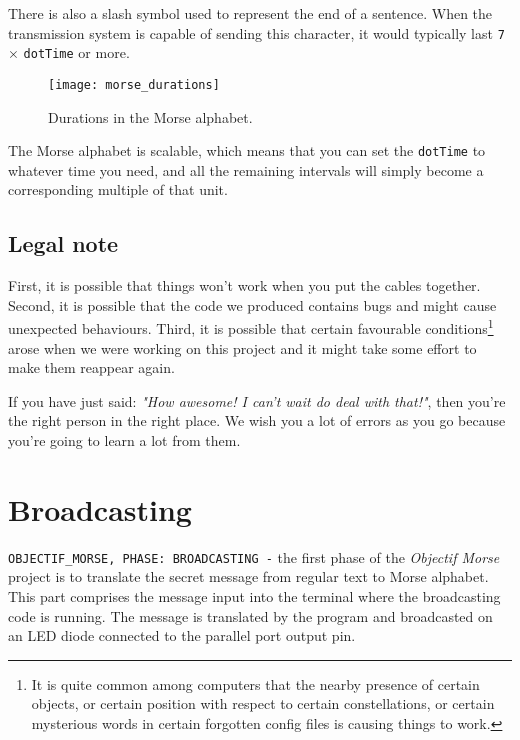 \documentclass[12pt]{report}
\begin{document}
There is also a slash symbol used to represent the end of a sentence. When the transmission system is capable of sending this character, it would typically last \verb|7| $\times$ \verb|dotTime| or more.

\begin{figure}[H]
\centering\texttt{[image: morse\_durations]}
\caption{Durations in the Morse alphabet.}			
\label{fig:morse_durations}
\end{figure}

The Morse alphabet is scalable, which means that you can set the \verb|dotTime| to whatever time you need, and all the remaining intervals will simply become a corresponding multiple of that unit.

\section{Legal note}

First, it is possible that things won't work when you put the cables together. Second, it is possible that the code we produced contains bugs and might cause unexpected behaviours. Third, it is possible that certain favourable conditions\footnote{It is quite common among computers that the nearby presence of certain objects, or certain position with respect to certain constellations, or certain mysterious words in certain forgotten config files is causing things to work.} arose when we were working on this project and it might take some effort to make them reappear again.

If you have just said: \textit{"How awesome! I can't wait do deal with that!"}, then you're the right person in the right place. We wish you a lot of errors as you go because you're going to learn a lot from them. 

\newpage

\chapter{Broadcasting}


\verb|OBJECTIF_MORSE, PHASE: BROADCASTING -| the first phase of the \textit{Objectif Morse} project is to translate the secret message from regular text to Morse alphabet. This part comprises the message input into the terminal where the broadcasting code is running. The message is translated by the program and broadcasted on an LED diode connected to the parallel port output pin.
\end{document}
